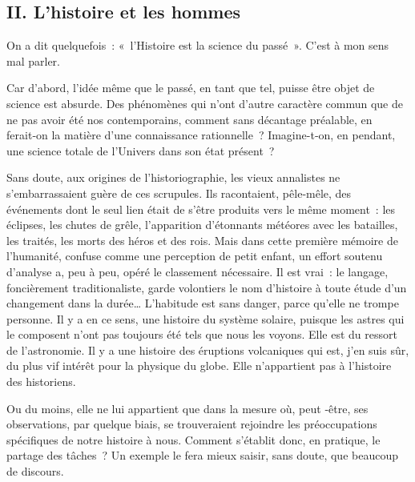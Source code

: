 \documentclass[french,twoside]{book} %
\newcommand{\astermono}{\medskip\centerline{\color{rubric}\large\selectfont{\syms ✻}}\medskip\par}%
\begin{document}
\subsection[{II. L’histoire et les hommes}]{II. L’histoire et les hommes}
\noindent On a dit quelquefois : « l’Histoire est la science du passé ». C’est à mon sens mal parler.\par
Car d’abord, l’idée même que le passé, en tant que tel, puisse être objet de science est absurde. Des phénomènes qui n’ont d’autre caractère com­mun que de ne pas avoir été nos contemporains, comment sans décantage préalable, en ferait‑on la matière d’une connaissance rationnelle ? Imagine-­t‑on, en pendant, une science totale de l’Univers dans son état présent ?\par
Sans doute, aux origines de l’historiographie, les vieux annalistes ne s’embarrassaient guère de ces scrupules. Ils racontaient, pêle‑mêle, des événements dont le seul lien était de s’être produits vers le même moment : les éclipses, les chutes de grêle, l’apparition d’étonnants météores avec les batailles, les traités, les morts des héros et des rois. Mais dans cette première mémoire de l’humanité, confuse comme une perception de petit enfant, un effort soutenu d’analyse a, peu à peu, opéré le classement nécessaire. Il est vrai : le langage, foncièrement traditionaliste, garde volontiers le nom d’histoire à toute étude d’un changement dans la durée… L’habitude est sans danger, parce qu’elle ne trompe personne. Il y a en ce sens, une histoire du système solaire, puisque les astres qui le com­posent n’ont pas toujours été tels que nous les voyons. Elle est du ressort de l’astronomie. Il y a une histoire des éruptions volcaniques qui est, j’en suis sûr, du plus vif intérêt pour la physique du globe. Elle n’appar­tient pas à l’histoire des historiens.\par
\label{p3} Ou du moins, elle ne lui appartient que dans la mesure où, peut ‑être, ses observations, par quelque biais, se trouveraient rejoindre les préoc­cupations spécifiques de notre histoire à nous. Comment s’établit donc, en pratique, le partage des tâches ? Un exemple le fera mieux saisir, sans doute, que beaucoup de discours.\par

\astermono
\end{document}
